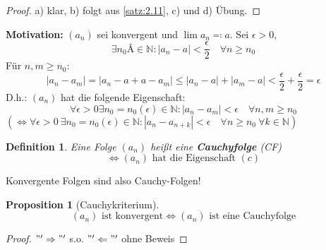\documentclass[titlepage,ngerman,a4paper,headsepline,DIV15,halfparskip*,14pt]{scrartcl}
\newcommand{\N}{\mathbb{N}}
\theoremstyle{dotless}
\newtheorem{prop}[satz]{Proposition}
\newtheorem*{definition}{Definition}
\begin{document}
\begin{proof}
	a) klar, b) folgt aus \ref{satz:2.11}, c) und d) Übung.
\end{proof}


\textbf{Motivation:} $(a_{n})$ sei konvergent und $\lim a_{n} \eqqcolon a$. Sei $\epsilon > 0$,
	$$ \exists n_{0}Â \in \N: |a_{n} - a| < \frac{\epsilon}{2} \quad \forall n \geq n_{0} $$
Für $n, m \geq n_{0}$:
	$$ |a_{n} - a_{m}| = |a_{n} - a + a - a_{m} | \leq |a_{n} - a| + |a_{m} - a| < \frac{\epsilon}{2} + \frac{\epsilon}{2} = \epsilon $$
D.h.: $(a_{n})$ hat die folgende Eigenschaft:
	\[ \forall \epsilon > 0 \exists n_{0} = n_{0}(\epsilon) \in \N: |a_{n} - a_{m}| < \epsilon \quad \forall n,m \geq n_{0} \tag*{(c)} \]
$(\iff\forall \epsilon > 0 ~\exists n_{0} = n_{0}(\epsilon) \in \N: |a_{n} - a_{n+k}| < \epsilon \quad \forall n \geq n_{0} ~\forall k \in \N)$

\begin{definition} 
	Eine Folge $(a_{n})$ hei{\ss}t eine \textbf{Cauchyfolge} (CF)
	$$ \iff (a_{n}) \text{ hat die Eigenschaft } (c) $$	
\end{definition}


Konvergente Folgen sind also Cauchy-Folgen!

\begin{prop}[Cauchykriterium] \label{prop:2.15}
	$$ (a_{n}) \text{ ist konvergent} \iff (a_{n}) \text{ ist eine Cauchyfolge} $$
\end{prop}

\begin{proof}
	$"'\Rightarrow"'$ s.o. $"'\Leftarrow"'$ ohne Beweis
\end{proof}
\end{document}
